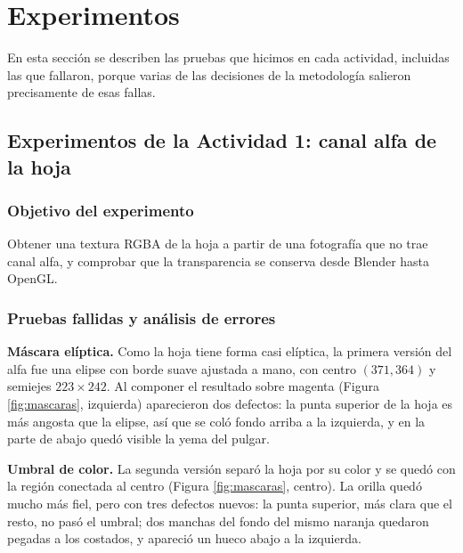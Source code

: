 
\section{Experimentos}

En esta sección se describen las pruebas que hicimos en cada actividad, incluidas las que fallaron, porque varias de las decisiones de la metodología salieron precisamente de esas fallas.

\subsection{Experimentos de la Actividad 1: canal alfa de la hoja}

\subsubsection{Objetivo del experimento}
Obtener una textura RGBA de la hoja a partir de una fotografía que no trae canal alfa, y comprobar que la transparencia se conserva desde Blender hasta OpenGL.

\subsubsection{Pruebas fallidas y análisis de errores}
\textbf{Máscara elíptica.} Como la hoja tiene forma casi elíptica, la primera versión del alfa fue una elipse con borde suave ajustada a mano, con centro $(371, 364)$ y semiejes $223 \times 242$. Al componer el resultado sobre magenta (Figura \ref{fig:mascaras}, izquierda) aparecieron dos defectos: la punta superior de la hoja es más angosta que la elipse, así que se coló fondo arriba a la izquierda, y en la parte de abajo quedó visible la yema del pulgar.

\textbf{Umbral de color.} La segunda versión separó la hoja por su color y se quedó con la región conectada al centro (Figura \ref{fig:mascaras}, centro). La orilla quedó mucho más fiel, pero con tres defectos nuevos: la punta superior, más clara que el resto, no pasó el umbral; dos manchas del fondo del mismo naranja quedaron pegadas a los costados, y apareció un hueco abajo a la izquierda.

